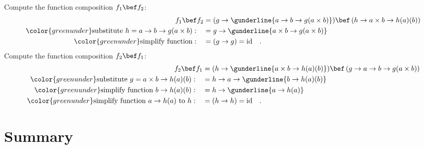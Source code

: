 Compute the function composition $f_{1}\bef f_{2}$:
\begin{align*}
f_{1}\bef f_{2} & =(g\rightarrow\gunderline{a\rightarrow b\rightarrow g(a\times b)})\bef\left(h\rightarrow a\times b\rightarrow h(a)(b)\right)\\
{\color{greenunder}\text{substitute }h=a\rightarrow b\rightarrow g(a\times b):}\quad & =g\rightarrow\gunderline{a\times b\rightarrow g(a\times b)}\\
{\color{greenunder}\text{simplify function}:}\quad & =\left(g\rightarrow g\right)=\text{id}\quad.
\end{align*}
Compute the function composition $f_{2}\bef f_{1}$:
\begin{align*}
f_{2}\bef f_{1} & =(h\rightarrow\gunderline{a\times b\rightarrow h(a)(b)})\bef\left(g\rightarrow a\rightarrow b\rightarrow g(a\times b)\right)\\
{\color{greenunder}\text{substitute }g=a\times b\rightarrow h(a)(b):}\quad & =h\rightarrow a\rightarrow\gunderline{b\rightarrow h(a)(b)}\\
{\color{greenunder}\text{simplify function }b\rightarrow h(a)(b):}\quad & =h\rightarrow\gunderline{a\rightarrow h(a)}\\
{\color{greenunder}\text{simplify function }a\rightarrow h(a)\text{ to }h:}\quad & =\left(h\rightarrow h\right)=\text{id}\quad.
\end{align*}


\section{Summary}

